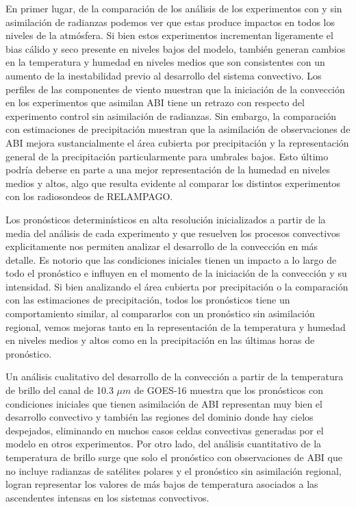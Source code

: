 \documentclass[12pt,oneside,a4paper]{reedthesis}
\begin{document}
En primer lugar, de la comparación de los análisis de los experimentos con y sin asimilación de radianzas podemos ver que estas produce impactos en todos los niveles de la atmósfera. Si bien estos experimentos incrementan ligeramente el bias cálido y seco presente en niveles bajos del modelo, también generan cambios en la temperatura y humedad en niveles medios que son consistentes con un aumento de la inestabilidad previo al desarrollo del sistema convectivo. Los perfiles de las componentes de viento muestran que la iniciación de la convección en los experimentos que asimilan ABI tiene un retrazo con respecto del experimento control sin asimilación de radianzas. Sin embargo, la comparación con estimaciones de precipitación muestran que la asimilación de observaciones de ABI mejora sustancialmente el área cubierta por precipitación y la representación general de la precipitación particularmente para umbrales bajos. Esto último podría deberse en parte a una mejor representación de la humedad en niveles medios y altos, algo que resulta evidente al comparar los distintos experimentos con los radiosondeos de RELAMPAGO.

Los pronósticos determinísticos en alta resolución inicializados a partir de la media del análisis de cada experimento y que resuelven los procesos convectivos explicitamente nos permiten analizar el desarrollo de la convección en más detalle. Es notorio que las condiciones iniciales tienen un impacto a lo largo de todo el pronóstico e influyen en el momento de la iniciación de la convección y su intensidad. Si bien analizando el área cubierta por precipitación o la comparación con las estimaciones de precipitación, todos los pronósticos tiene un comportamiento similar, al compararlos con un pronóstico sin asimilación regional, vemos mejoras tanto en la representación de la temperatura y humedad en niveles medios y altos como en la precipitación en las últimas horas de pronóstico.

Un análisis cualitativo del desarrollo de la convección a partir de la temperatura de brillo del canal de 10.3 \(\mu m\) de GOES-16 muestra que los pronósticos con condiciones iniciales que tienen asimilación de ABI representan muy bien el desarrollo convectivo y también las regiones del dominio donde hay cielos despejados, eliminando en muchos casos celdas convectivas generadas por el modelo en otros experimentos. Por otro lado, del análisis cuantitativo de la temperatura de brillo surge que solo el pronóstico con observaciones de ABI que no incluye radianzas de satélites polares y el pronóstico sin asimilación regional, logran representar los valores de más bajos de temperatura asociados a las ascendentes intensas en los sistemas convectivos.
\end{document}
